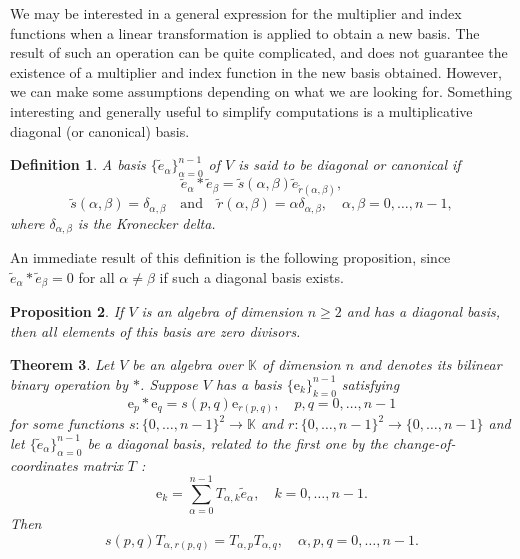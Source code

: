 \documentclass{article}
\newtheorem{theorem}{Theorem}
\newtheorem{definition}[theorem]{Definition}
\newtheorem{proposition}[theorem]{Proposition}
\begin{document}
We may be interested in a general expression for the multiplier and index functions when a linear transformation is applied to obtain a new basis. The result of such an operation can be quite complicated, and does not guarantee the existence of a multiplier and index function in the new basis obtained. However, we can make some assumptions depending on what we are looking for. Something interesting and generally useful to simplify computations is a multiplicative diagonal (or canonical) basis.
\begin{definition}
    \label{multiplicative diagonal basis : diagonal basis def}
    A basis $\{ {\tilde e}_{\alpha} \}_{\alpha=0}^{n-1}$ of $V$ is said to be diagonal or canonical if
    $$ {\tilde e}_{\alpha} * {\tilde e}_{\beta} = \tilde s(\alpha,\beta) {\tilde e}_{\tilde r (\alpha,\beta)}, $$
    $$ \tilde s(\alpha,\beta) = \delta_{\alpha,\beta} \quad \text{and} \quad \tilde r(\alpha,\beta) = \alpha \delta_{\alpha,\beta}, \quad \alpha,\beta = 0,\ldots,n-1, $$
    where $\delta_{\alpha,\beta}$ is the Kronecker delta.
\end{definition}
An immediate result of this definition is the following proposition, since ${\tilde e}_{\alpha} * {\tilde e}_{\beta} = 0$ for all $\alpha \neq \beta$ if such a diagonal basis exists.
\begin{proposition}
    If $V$ is an algebra of dimension $n \geq 2$ and has a diagonal basis, then all elements of this basis are zero divisors.
\end{proposition}
\begin{theorem}
    \label{multiplicative diagonal basis : basic thm}
    Let $V$ be an algebra over $\mathbb{K}$ of dimension $n$ and denotes its bilinear binary operation by $*$. Suppose $V$ has a basis $\{ \mathrm e_k \}_{k=0}^{n-1}$ satisfying
    $$ \mathrm e_p * \mathrm e_q = s(p,q) \mathrm e_{r(p,q)}, \quad p,q = 0,\ldots,n-1 $$
    for some functions $s:\{0,\ldots,n-1\}^2 \rightarrow \mathbb{K}$ and $r:\{0,\ldots,n-1\}^2 \rightarrow \{0,\ldots,n-1\}$ and let $\{ {\tilde e}_{\alpha} \}_{\alpha=0}^{n-1}$ be a diagonal basis, related to the first one by the change-of-coordinates matrix $T$ \cite{sergeLangLinear, Lipschutz}:
    $$ \mathrm e_k = \sum_{\alpha=0}^{n-1} T_{\alpha, k} {\tilde e}_{\alpha}, \quad k = 0,\ldots, n-1. $$
    Then
    $$ s(p,q) T_{\alpha, r(p,q)} = T_{\alpha, p} T_{\alpha, q}, \quad \alpha,p,q=0,\ldots,n-1. $$
\end{theorem}
\end{document}
